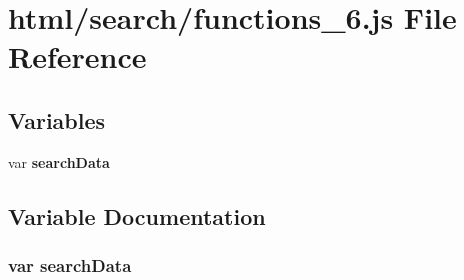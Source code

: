 \section{html/search/functions\-\_\-6.js File Reference}
\label{functions__6_8js}
\subsection*{Variables}
\begin{DoxyCompactItemize}
\item 
var {\bf search\-Data}
\end{DoxyCompactItemize}


\subsection{Variable Documentation}
\subsubsection[{search\-Data}]{\setlength{\rightskip}{0pt plus 5cm}var search\-Data}\label{functions__6_8js_ad01a7523f103d6242ef9b0451861231e}
